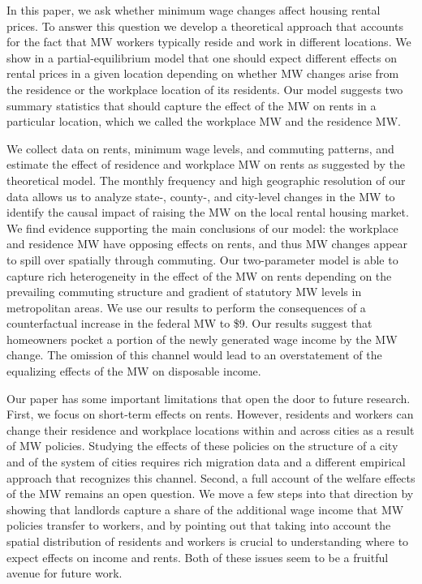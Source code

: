 
In this paper, we ask whether minimum wage changes affect housing rental prices.
To answer this question we develop a theoretical approach that accounts for
the fact that MW workers typically reside and work in different locations.
We show in a partial-equilibrium model that one should expect different effects
on rental prices in a given location depending on whether MW changes arise from 
the residence or the workplace location of its residents.
Our model suggests two summary statistics that should capture the effect of 
the MW on rents in a particular location, which we called the workplace MW and 
the residence MW.

We collect data on rents, minimum wage levels, and commuting patterns, and
estimate the effect of residence and workplace MW on rents as suggested by
the theoretical model.
The monthly frequency and high geographic resolution of our data allows us to 
analyze state-, county-, and city-level changes in the MW to identify the causal 
impact of raising the MW on the local rental housing market.
We find evidence supporting the main conclusions of our model: the workplace and 
residence MW have opposing effects on rents, and thus MW changes appear to 
spill over spatially through commuting.
Our two-parameter model is able to capture rich heterogeneity in the effect 
of the MW on rents depending on the prevailing commuting structure and 
gradient of statutory MW levels in metropolitan areas.
We use our results to perform the consequences of a counterfactual increase 
in the federal MW to \$9.
Our results suggest that homeowners pocket a portion of the newly generated 
wage income by the MW change.
The omission of this channel would lead to an overstatement of the equalizing 
effects of the MW on disposable income.

Our paper has some important limitations that open the door to future research.
First, we focus on short-term effects on rents.
However, residents and workers can change their residence and workplace 
locations within and across cities as a result of MW policies.
Studying the effects of these policies on the structure of a city and of the 
system of cities requires rich migration data and a different empirical approach
that recognizes this channel.
Second, a full account of the welfare effects of the MW remains an open question.
We move a few steps into that direction by showing that landlords capture a 
share of the additional wage income that MW policies transfer to workers, and 
by pointing out that taking into account the spatial distribution of residents 
and workers is crucial to understanding where to expect effects on income and 
rents.
Both of these issues seem to be a fruitful avenue for future work.
